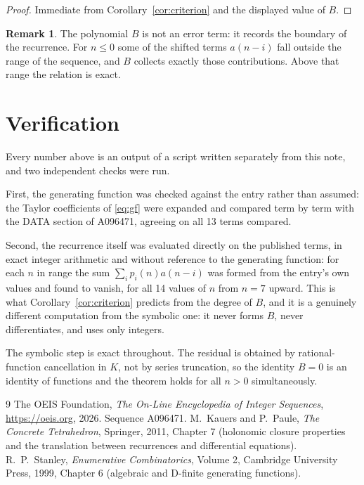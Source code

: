\documentclass[11pt,a4paper]{article}
\theoremstyle{plain}
\theoremstyle{definition}
\newtheorem{remark}[theorem]{Remark}
\begin{document}
\begin{proof}
Immediate from Corollary~\ref{cor:criterion} and the displayed value of $B$.
\end{proof}

\begin{remark}
The polynomial $B$ is not an error term: it records the boundary of the recurrence. For
$n\le0$ some of the shifted terms $a(n-i)$ fall outside the range of the sequence,
and $B$ collects exactly those contributions. Above that range the relation is exact.
\end{remark}

\section{Verification}

Every number above is an output of a script written separately from this note, and two
independent checks were run.

First, the generating function was checked against the entry rather than assumed: the
Taylor coefficients of \eqref{eq:gf} were expanded and compared term by term with the DATA
section of A096471, agreeing on all 13 terms compared.

Second, the recurrence itself was evaluated directly on the published terms, in exact
integer arithmetic and without reference to the generating function: for each $n$ in range
the sum $\sum_{i}p_{i}(n)a(n-i)$ was formed from the entry's own values and found to
vanish, for all 14 values of $n$ from $n=7$ upward. This is what
Corollary~\ref{cor:criterion} predicts from the degree of $B$, and it is a genuinely
different computation from the symbolic one: it never forms $B$, never differentiates, and
uses only integers.

The symbolic step is exact throughout. The residual is obtained by rational-function
cancellation in $K$, not by series truncation, so the identity $B=0$ is an
identity of functions and the theorem holds for all $n>0$ simultaneously.

\begin{thebibliography}{9}
 The OEIS Foundation, \emph{The On-Line Encyclopedia of Integer Sequences},
\url{https://oeis.org}, 2026. Sequence A096471.
 M.~Kauers and P.~Paule, \emph{The Concrete Tetrahedron}, Springer, 2011,
Chapter 7 (holonomic closure properties and the translation between recurrences and
differential equations).
 R.~P.~Stanley, \emph{Enumerative Combinatorics}, Volume 2, Cambridge
University Press, 1999, Chapter 6 (algebraic and D-finite generating functions).
\end{thebibliography}
\end{document}
